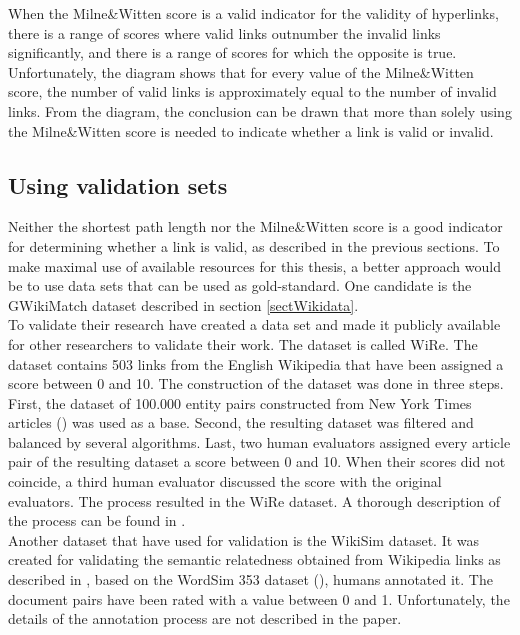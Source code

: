 When the Milne\&Witten score is a valid indicator for the validity of hyperlinks, there is a range of scores where valid links outnumber the invalid links significantly, and there is a range of scores for which the opposite is true. Unfortunately, the diagram shows that for every value of the Milne\&Witten score, the number of valid links is approximately equal to the number of invalid links. From the diagram, the conclusion can be drawn that more than solely using the Milne\&Witten score is needed to indicate whether a link is valid or invalid. 

\subsection{Using validation sets}
\label{secUsingValidationSets}
Neither the shortest path length nor the Milne\&Witten score is a good indicator for determining whether a link is valid, as described in the previous sections. To make maximal use of available resources for this thesis, a better approach would be to use data sets that can be used as gold-standard. One candidate is the GWikiMatch dataset described in section \ref{sectWikidata}.\\

To validate their research \citet{Ponza2017} have created a data set and made it publicly available for other researchers to validate their work. The dataset is called WiRe. The dataset contains 503 links from the English Wikipedia that have been assigned a score between 0 and 10. The construction of the dataset was done in three steps. First, the dataset of 100.000 entity pairs constructed from New York Times articles (\citep{Dunietz2014}) was used as a base. Second, the resulting dataset was filtered and balanced by several algorithms. Last, two human evaluators assigned every article pair of the resulting dataset a score between 0 and 10. When their scores did not coincide, a third human evaluator discussed the score with the original evaluators. The process resulted in the WiRe dataset. A thorough description of the process can be found in \citep{Ponza2017}.\\

Another dataset that \citet{Ponza2017}  have used for validation is the WikiSim dataset. It was created for validating the semantic relatedness obtained from Wikipedia links as described in \citep{Witten2008}, based on the WordSim 353 dataset (\citet{word353}), humans annotated it. The document pairs have been rated with a value between 0 and 1. Unfortunately, the details of the annotation process are not described in the paper.\\ %

